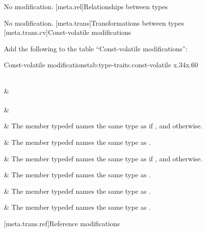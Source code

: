 \documentclass[ebook,10pt,oneside,openany,final]{memoir}
\newenvironment{libreqtab2b}[2]
{
 \begin{LongTable}
 {#1}{#2}
 {x{.34\hsize}x{.60\hsize}}
}
{
 \end{LongTable}
}
\begin{document}
\pnum
No modification.
[meta.rel]{Relationships between types}

\pnum
No modification.
[meta.trans]{Transformations between types}
[meta.trans.cv]{Const-volatile modifications}

\pnum
Add the following to the table ``Const-volatile modifications'':

\begin{libreqtab2b}{Const-volatile modifications}{tab:type-traits.const-volatile}
\\ \topline
{} &    \\ \capsep
\endfirsthead
\continuedcaption\\
\topline
{} &    \\ \capsep
\endhead

%
 &
The member typedef  names the same type as  if , and  otherwise.
\\ \rowsep

%
 &
The member typedef  names the same type as .
\\ \rowsep

%
 &
The member typedef  names the same type as  if , and  otherwise.
\\ \rowsep

%
 &
The member typedef  names the same type as .
\\ \rowsep

%
 &
The member typedef  names the same type as .
\\ \rowsep

%
 &
The member typedef  names the same type as .
\\
\end{libreqtab2b}
[meta.trans.ref]{Reference modifications}
\end{document}
